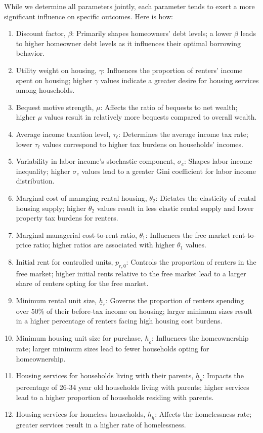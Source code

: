 \documentclass[parskip=full]{article}
\begin{document}
While we determine all parameters jointly, each parameter tends to exert a more significant influence on specific outcomes. Here is how:
\begin{enumerate}
    \item Discount factor, $\beta$: Primarily shapes homeowners' debt levels; a lower $\beta$ leads to higher homeowner debt levels as it influences their optimal borrowing behavior.
    \item Utility weight on housing, $\gamma$: Influences the proportion of renters' income spent on housing; higher $\gamma$ values indicate a greater desire for housing services among households.
    \item Bequest motive strength, $\mu$: Affects the ratio of bequests to net wealth; higher $\mu$ values result in relatively more bequests compared to overall wealth.
    \item Average income taxation level, $\tau_{\ell}$: Determines the average income tax rate; lower $\tau_{\ell}$ values correspond to higher tax burdens on households' incomes.
    \item Variability in labor income's stochastic component, $\sigma_{e}$: Shapes labor income inequality; higher $\sigma_{e}$ values lead to a greater Gini coefficient for labor income distribution.
    \item Marginal cost of managing rental housing, $\theta_{2}$: Dictates the elasticity of rental housing supply; higher $\theta_{2}$ values result in less elastic rental supply and lower property tax burdens for renters.
    \item Marginal managerial cost-to-rent ratio, $\theta_{1}$: Influences the free market rent-to-price ratio; higher ratios are associated with higher $\theta_{1}$ values.
    \item Initial rent for controlled units, $p_{r,0}$: Controls the proportion of renters in the free market; higher initial rents relative to the free market lead to a larger share of renters opting for the free market.
    \item Minimum rental unit size, $\underline{h}_{r}$: Governs the proportion of renters spending over 50\% of their before-tax income on housing; larger minimum sizes result in a higher percentage of renters facing high housing cost burdens.
    \item Minimum housing unit size for purchase, $\underline{h}_{o}$: Influences the homeownership rate; larger minimum sizes lead to fewer households opting for homeownership.
    \item Housing services for households living with their parents, $\underline{h}_{p}$: Impacts the percentage of 26-34 year old households living with parents; higher services lead to a higher proportion of households residing with parents.
    \item Housing services for homeless households, $\underline{h}_{h}$: Affects the homelessness rate; greater services result in a higher rate of homelessness.
\end{enumerate}
\end{document}
